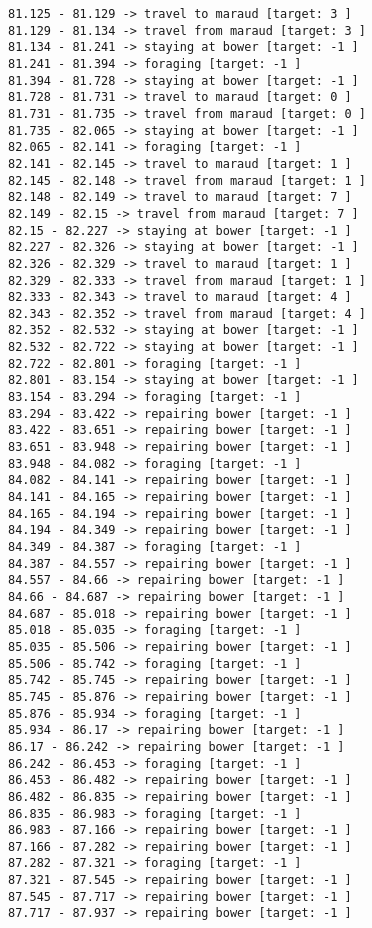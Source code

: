 \documentclass[11pt]{article}
\begin{document}
\begin{Verbatim}[commandchars=\\\{\}]
81.125 - 81.129 -> travel to maraud [target: 3 ]
81.129 - 81.134 -> travel from maraud [target: 3 ]
81.134 - 81.241 -> staying at bower [target: -1 ]
81.241 - 81.394 -> foraging [target: -1 ]
81.394 - 81.728 -> staying at bower [target: -1 ]
81.728 - 81.731 -> travel to maraud [target: 0 ]
81.731 - 81.735 -> travel from maraud [target: 0 ]
81.735 - 82.065 -> staying at bower [target: -1 ]
82.065 - 82.141 -> foraging [target: -1 ]
82.141 - 82.145 -> travel to maraud [target: 1 ]
82.145 - 82.148 -> travel from maraud [target: 1 ]
82.148 - 82.149 -> travel to maraud [target: 7 ]
82.149 - 82.15 -> travel from maraud [target: 7 ]
82.15 - 82.227 -> staying at bower [target: -1 ]
82.227 - 82.326 -> staying at bower [target: -1 ]
82.326 - 82.329 -> travel to maraud [target: 1 ]
82.329 - 82.333 -> travel from maraud [target: 1 ]
82.333 - 82.343 -> travel to maraud [target: 4 ]
82.343 - 82.352 -> travel from maraud [target: 4 ]
82.352 - 82.532 -> staying at bower [target: -1 ]
82.532 - 82.722 -> staying at bower [target: -1 ]
82.722 - 82.801 -> foraging [target: -1 ]
82.801 - 83.154 -> staying at bower [target: -1 ]
83.154 - 83.294 -> foraging [target: -1 ]
83.294 - 83.422 -> repairing bower [target: -1 ]
83.422 - 83.651 -> repairing bower [target: -1 ]
83.651 - 83.948 -> repairing bower [target: -1 ]
83.948 - 84.082 -> foraging [target: -1 ]
84.082 - 84.141 -> repairing bower [target: -1 ]
84.141 - 84.165 -> repairing bower [target: -1 ]
84.165 - 84.194 -> repairing bower [target: -1 ]
84.194 - 84.349 -> repairing bower [target: -1 ]
84.349 - 84.387 -> foraging [target: -1 ]
84.387 - 84.557 -> repairing bower [target: -1 ]
84.557 - 84.66 -> repairing bower [target: -1 ]
84.66 - 84.687 -> repairing bower [target: -1 ]
84.687 - 85.018 -> repairing bower [target: -1 ]
85.018 - 85.035 -> foraging [target: -1 ]
85.035 - 85.506 -> repairing bower [target: -1 ]
85.506 - 85.742 -> foraging [target: -1 ]
85.742 - 85.745 -> repairing bower [target: -1 ]
85.745 - 85.876 -> repairing bower [target: -1 ]
85.876 - 85.934 -> foraging [target: -1 ]
85.934 - 86.17 -> repairing bower [target: -1 ]
86.17 - 86.242 -> repairing bower [target: -1 ]
86.242 - 86.453 -> foraging [target: -1 ]
86.453 - 86.482 -> repairing bower [target: -1 ]
86.482 - 86.835 -> repairing bower [target: -1 ]
86.835 - 86.983 -> foraging [target: -1 ]
86.983 - 87.166 -> repairing bower [target: -1 ]
87.166 - 87.282 -> repairing bower [target: -1 ]
87.282 - 87.321 -> foraging [target: -1 ]
87.321 - 87.545 -> repairing bower [target: -1 ]
87.545 - 87.717 -> repairing bower [target: -1 ]
87.717 - 87.937 -> repairing bower [target: -1 ]

\end{Verbatim}
\end{document}
